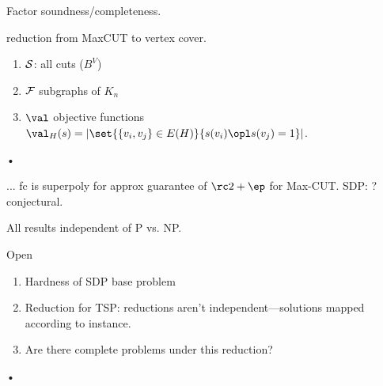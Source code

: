Factor soundness/completeness.

reduction from MaxCUT to vertex cover. 
\begin{enumerate}
\item
$\cal S$: all cuts ($B^V$)
\item
$\cal F$ subgraphs of $K_n$
\item
$\val$ objective functions $\val_H(s)=|\set{\{v_i,v_j\}\in E(H)}{s(v_i)\opl s(v_j)=1}|$.
\end{enumerate}•


...
fc is superpoly for approx guarantee of $\rc2+\ep$ for Max-CUT. SDP: ? conjectural.

All results independent of P vs. NP.

Open
\begin{enumerate}
\item
Hardness of SDP base problem
\item
Reduction for TSP: reductions aren't independent---solutions mapped according to instance.
\item Are there complete problems under this reduction?
\end{enumerate}•
